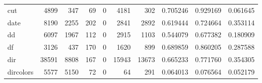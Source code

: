 \begin{tabular}{lrrrrrrrrr}
cut       &                                               4899 &                                                347 &                                                 69 &                                                  0 &                                               4181 &                                                302 &                                           0.705246 &                               0.929169 &                             0.061645 \\
date      &                                               8190 &                                               2255 &                                                202 &                                                  0 &                                               2841 &                                               2892 &                                           0.619444 &                               0.724664 &                             0.353114 \\
dd        &                                               6097 &                                               1967 &                                                112 &                                                  0 &                                               2915 &                                               1103 &                                           0.544079 &                               0.677382 &                             0.180909 \\
df        &                                               3126 &                                                437 &                                                170 &                                                  0 &                                               1620 &                                                899 &                                           0.689859 &                               0.860205 &                             0.287588 \\
dir       &                                              38591 &                                               8808 &                                                167 &                                                  0 &                                              15943 &                                              13673 &                                           0.665233 &                               0.771760 &                             0.354305 \\
dircolors &                                               5577 &                                               5150 &                                                 72 &                                                  0 &                                                 64 &                                                291 &                                           0.064013 &                               0.076564 &                             0.052179 \\

\end{tabular}

